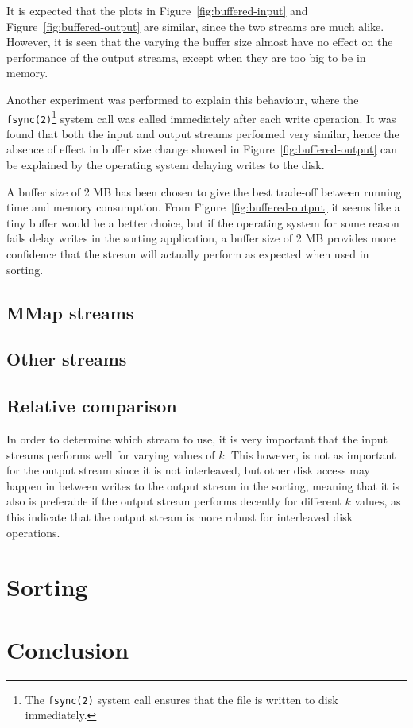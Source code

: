 \documentclass[a4paper,12pt]{article}
\begin{document}
It is expected that the plots in Figure~\ref{fig:buffered-input} and
Figure~\ref{fig:buffered-output} are similar, since the two streams
are much alike. However, it is seen that the varying the buffer size
almost have no effect on the performance of the output streams, except
when they are too big to be in memory.

Another experiment was performed to explain this behaviour, where the
\texttt{fsync(2)}\footnote{The \texttt{fsync(2)} system call ensures
  that the file is written to disk immediately.} system call was
called immediately after each write operation. It was found that both
the input and output streams performed very similar, hence the absence
of effect in buffer size change showed in
Figure~\ref{fig:buffered-output} can be explained by the operating
system delaying writes to the disk.

A buffer size of 2 MB has been chosen to give the best trade-off
between running time and memory consumption. From
Figure~\ref{fig:buffered-output} it seems like a tiny buffer would be
a better choice, but if the operating system for some reason fails
delay writes in the sorting application, a buffer size of 2 MB
provides more confidence that the stream will actually perform as
expected when used in sorting.

\subsection{MMap streams}

\subsection{Other streams}

\subsection{Relative comparison}
In order to determine which stream to use, it is very important that
the input streams performs well for varying values of $k$. This
however, is not as important for the output stream since it is not
interleaved, but other disk access may happen in between writes to the
output stream in the sorting, meaning that it is also is preferable if
the output stream performs decently for different $k$ values, as this
indicate that the output stream is more robust for interleaved disk
operations.

\section{Sorting}

%
%

\section{Conclusion}


\clearpage{}
\end{document}

